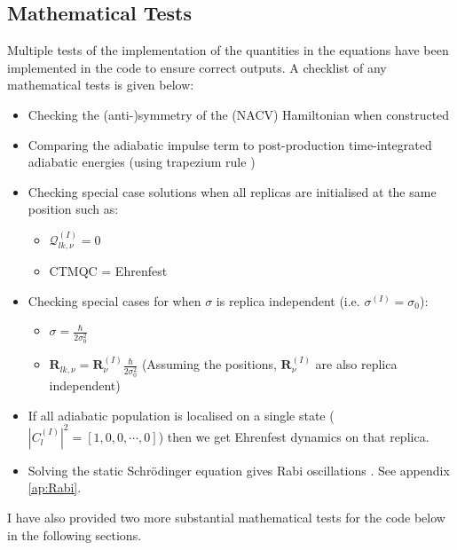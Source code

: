 \subsection{Mathematical Tests}
Multiple tests of the implementation of the quantities in the equations have been implemented in the code to ensure correct outputs. A checklist of any mathematical tests is given below:
\begin{itemize}
  \item Checking the (anti-)symmetry of the (NACV) Hamiltonian when constructed
  
  \item Comparing the   adiabatic impulse  term to post-production time-integrated adiabatic energies (using trapezium rule \cite{NumericalAnalysis})
  
  \item Checking special case solutions when all replicas are initialised at the same position such as:
	\begin{itemize}
	  \item $\mathcal{Q}_{lk, \nu}^{(I)} = 0$
	  \item CTMQC = Ehrenfest
	\end{itemize}

\item Checking special cases for when $\sigma$ is replica independent (i.e. $\sigma^{(I)} = \sigma_{0}$):
	\begin{itemize}
		\item $\sigma = \frac{\hbar}{2 \sigma_{0}^2}$
	  \item $\mathbf{R}_{lk, \nu} = \mathbf{R}_{\nu}^{(I)} \frac{\hbar}{2 \sigma_0^2}$ (Assuming the positions, $\mathbf{R}_{\nu}^{(I)}$ are also replica independent)
	\end{itemize}

\item If all adiabatic population is localised on a single state ($|C_{l}^{(I)}|^2 = [1, 0, 0, \cdots, 0]$) then we get Ehrenfest dynamics on that replica.
  \item Solving the static Schr\"odinger equation gives Rabi oscillations \cite{FeynmanLectVol3}. See appendix \ref{ap:Rabi}.
\end{itemize}

I have also provided two  more substantial mathematical tests for the code below in the following sections.
